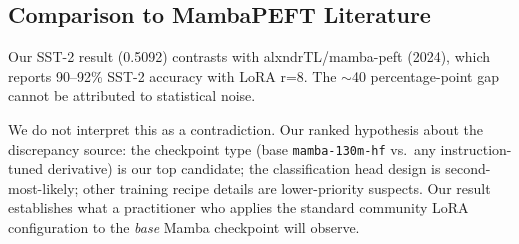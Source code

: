 \subsection{Comparison to MambaPEFT Literature}

Our SST-2 result (0.5092) contrasts with alxndrTL/mamba-peft (2024), which reports 90--92\% SST-2 accuracy with LoRA r=8. The $\sim$40 percentage-point gap cannot be attributed to statistical noise.

We do not interpret this as a contradiction. Our ranked hypothesis about the discrepancy source: the checkpoint type (base \texttt{mamba-130m-hf} vs.\ any instruction-tuned derivative) is our top candidate; the classification head design is second-most-likely; other training recipe details are lower-priority suspects. Our result establishes what a practitioner who applies the standard community LoRA configuration to the \emph{base} Mamba checkpoint will observe.
